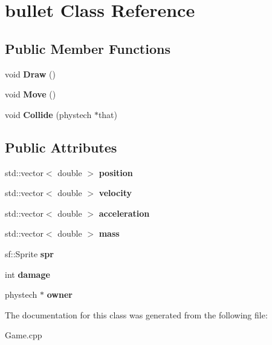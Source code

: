 \hypertarget{classbullet}{}\section{bullet Class Reference}
\label{classbullet}
\subsection*{Public Member Functions}
\begin{DoxyCompactItemize}
\item 
\mbox{\label{classbullet_aa352ee7946c9190a9cfc525bb381f15a}} 
void {\bfseries Draw} ()
\item 
\mbox{\label{classbullet_a78e302a8e1c5b12e8a76b5d0ab74effb}} 
void {\bfseries Move} ()
\item 
\mbox{\label{classbullet_a515d65214c750f16f112cff40580b1e4}} 
void {\bfseries Collide} (phystech $\ast$that)
\end{DoxyCompactItemize}
\subsection*{Public Attributes}
\begin{DoxyCompactItemize}
\item 
\mbox{\label{classbullet_aa6de368bdd8952bc4cf5635978690f80}} 
std\+::vector$<$ double $>$ {\bfseries position}
\item 
\mbox{\label{classbullet_a16b9256cf29cb0fa3e1d1ca0ce6a617b}} 
std\+::vector$<$ double $>$ {\bfseries velocity}
\item 
\mbox{\label{classbullet_aa6b6a4409dc214f00b786ba6b8ff35dd}} 
std\+::vector$<$ double $>$ {\bfseries acceleration}
\item 
\mbox{\label{classbullet_a3709c899874985954d3de4ae698eb523}} 
std\+::vector$<$ double $>$ {\bfseries mass}
\item 
\mbox{\label{classbullet_a995c28a7f9c0381c321c28a6b1d12f2b}} 
sf\+::\+Sprite {\bfseries spr}
\item 
\mbox{\label{classbullet_a778d9d2385d5533b6945520e262b9b2e}} 
int {\bfseries damage}
\item 
\mbox{\label{classbullet_a3bffbcb5a639b9d6eef24f61bfbe4f68}} 
phystech $\ast$ {\bfseries owner}
\end{DoxyCompactItemize}


The documentation for this class was generated from the following file\+:\begin{DoxyCompactItemize}
\item 
Game.\+cpp\end{DoxyCompactItemize}
